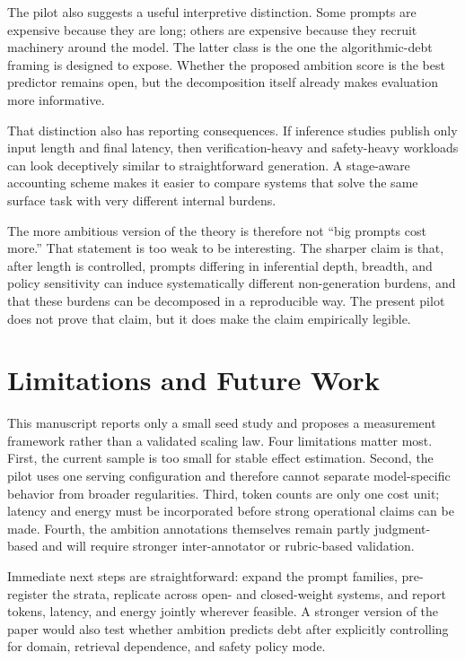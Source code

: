 \documentclass{svjour3}
\begin{document}
The pilot also suggests a useful interpretive distinction. Some prompts are expensive because they are long; others are expensive because they recruit machinery around the model. The latter class is the one the algorithmic-debt framing is designed to expose. Whether the proposed ambition score is the best predictor remains open, but the decomposition itself already makes evaluation more informative.

That distinction also has reporting consequences. If inference studies publish only input length and final latency, then verification-heavy and safety-heavy workloads can look deceptively similar to straightforward generation. A stage-aware accounting scheme makes it easier to compare systems that solve the same surface task with very different internal burdens.

The more ambitious version of the theory is therefore not ``big prompts cost more.'' That statement is too weak to be interesting. The sharper claim is that, after length is controlled, prompts differing in inferential depth, breadth, and policy sensitivity can induce systematically different non-generation burdens, and that these burdens can be decomposed in a reproducible way. The present pilot does not prove that claim, but it does make the claim empirically legible.

\section{Limitations and Future Work}
This manuscript reports only a small seed study and proposes a measurement framework rather than a validated scaling law. Four limitations matter most. First, the current sample is too small for stable effect estimation. Second, the pilot uses one serving configuration and therefore cannot separate model-specific behavior from broader regularities. Third, token counts are only one cost unit; latency and energy must be incorporated before strong operational claims can be made. Fourth, the ambition annotations themselves remain partly judgment-based and will require stronger inter-annotator or rubric-based validation.

Immediate next steps are straightforward: expand the prompt families, pre-register the strata, replicate across open- and closed-weight systems, and report tokens, latency, and energy jointly wherever feasible. A stronger version of the paper would also test whether ambition predicts debt after explicitly controlling for domain, retrieval dependence, and safety policy mode.
\end{document}
